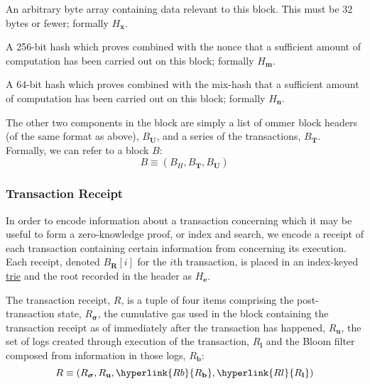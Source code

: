 \documentclass[9pt,oneside]{amsart}
\begin{document}
\begin{multicols}{2}
\begin{description}
{\item[extraData] An arbitrary byte array containing data relevant to this block. This must be 32 bytes or fewer; formally $H_\mathbf{x}$.}\hypertarget{H m}{
\item[mixHash] A 256-bit hash which proves combined with the nonce that a sufficient amount of computation has been carried out on this block; formally $H_\mathbf{m}$.}
\hypertarget{block nonce}{\hypertarget{H n}{
\item[nonce] A 64-bit hash which proves combined with the mix-hash that a sufficient amount of computation has been carried out on this block; formally $H_\mathbf{n}$.}}
\end{description}
\hypertarget{B U}{
The other two components in the block are simply a list of ommer block headers (of the same format as above), $B_\mathbf{U}$, and a series of the transactions, $B_\mathbf{T}$. Formally, we can refer to a block $B$:
\begin{equation}
B \equiv (B_H, B_\mathbf{T}, B_\mathbf{U})
\end{equation}}

\hypertarget{Transaction Receipt}{\subsubsection{Transaction Receipt}}

In order to encode information about a transaction concerning which it may be useful to form a zero-knowledge proof, or index and search, we encode a receipt of each transaction containing certain information from concerning its execution.
Each receipt, denoted $B_\mathbf{R}[i]$ for the $i$th transaction, is placed in an index-keyed \hyperlink{trie}{trie} and the root recorded in the header as \hyperlink{H e}{$H_\mathbf{e}$}.

\hypertarget{R}{}
The transaction receipt, $R$, is a tuple of four items \hypertarget{R sigma}{comprising the post-transaction state, $R_{\boldsymbol{\sigma}}$}, \hypertarget{R u}{the cumulative gas used in the block containing the transaction receipt as of immediately after the transaction has happened, $R_\mathbf{u}$}, the set of logs created through execution of the transaction, \hyperlink{R l}{$R_\mathbf{l}$} and the Bloom filter composed from information in those logs, \hyperlink{R b}{$R_\mathbf{b}$}:
\begin{equation}
R \equiv (R_{\boldsymbol{\sigma}}, R_\mathbf{u}, \hyperlink{R b}{R_\mathbf{b}}, \hyperlink{R l}{R_\mathbf{l}})
\end{equation}


\end{multicols}
\end{document}

